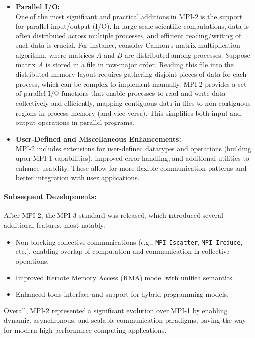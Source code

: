 \documentclass[12pt]{book}
\begin{document}
\begin{itemize}
    \item \textbf{Parallel I/O:} \\
    One of the most significant and practical additions in MPI-2 is the support for parallel input/output (I/O). In large-scale scientific computations, data is often distributed across multiple processes, and efficient reading/writing of such data is crucial. For instance, consider Cannon's matrix multiplication algorithm, where matrices $A$ and $B$ are distributed among processes. Suppose matrix $A$ is stored in a file in row-major order. Reading this file into the distributed memory layout requires gathering disjoint pieces of data for each process, which can be complex to implement manually. MPI-2 provides a set of parallel I/O functions that enable processes to read and write data collectively and efficiently, mapping contiguous data in files to non-contiguous regions in process memory (and vice versa). This simplifies both input and output operations in parallel programs.

    \item \textbf{User-Defined and Miscellaneous Enhancements:} \\
    MPI-2 includes extensions for user-defined datatypes and operations (building upon MPI-1 capabilities), improved error handling, and additional utilities to enhance usability. These allow for more flexible communication patterns and better integration with user applications.
\end{itemize}

\paragraph{Subsequent Developments:}  
After MPI-2, the MPI-3 standard was released, which introduced several additional features, most notably:
\begin{itemize}
    \item Non-blocking collective communications (e.g., \texttt{MPI\_Iscatter}, \texttt{MPI\_Ireduce}, etc.), enabling overlap of computation and communication in collective operations.
    \item Improved Remote Memory Access (RMA) model with unified semantics.
    \item Enhanced tools interface and support for hybrid programming models.
\end{itemize}

Overall, MPI-2 represented a significant evolution over MPI-1 by enabling dynamic, asynchronous, and scalable communication paradigms, paving the way for modern high-performance computing applications.
\end{document}

